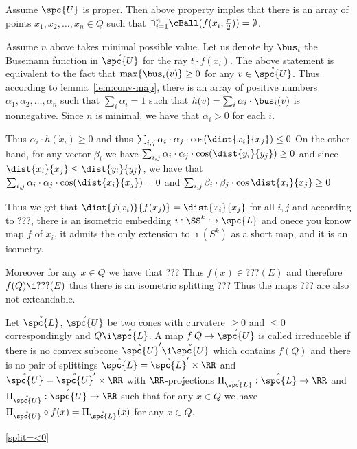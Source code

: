 {Assume $\spc{U}$ is proper.
Then above property imples that there is an array of points $x_1,x_2,\dots, x_n\in Q$ such that
$\cap_{i=1}^n\cBall(f(x_i,\tfrac\pi2))=\emptyset$.

Assume $n$ above takes minimal possible value.
Let us denote by $\bus_i$ the Busemann function in $\mathring{\spc{U}}$ for the ray $t\cdot f(x_i)$.
The above statement is equivalent to the fact that $\max\{\bus_i(v)\}\ge0$ for any $v\in \mathring{\spc{U}}$.
Thus according to lemma~\ref{lem:conv-map}, there is an array of positive numbers $\alpha_1,\alpha_2,\dots,\alpha_n$ 
such that $\sum_i\alpha_i=1$ such that $h(v)=\sum_i\alpha_i\cdot\bus_i(v)$ is nonnegative.
Since $n$ is minimal, we have that $\alpha_i>0$ for each $i$.

Thus $\alpha_i\cdot h(\mathring{x}_i)\ge 0$ and thus
$\sum_{i,j}\alpha_i\cdot\alpha_j\cdot\cos(\dist{x_i}{x_j})\le 0$
On the other hand, for any vector $\beta_i$ we have 
$\sum_{i,j}\alpha_i\cdot\alpha_j\cdot\cos(\dist{y_i}{y_j})\ge 0$ and since
$\dist{x_i}{x_j}\le\dist{y_i}{y_j}$, we have that $\sum_{i,j}\alpha_i\cdot\alpha_j\cdot\cos(\dist{x_i}{x_j})=0$ and $\sum_{i,j}\beta_i\cdot\beta_j\cdot\cos\dist{x_i}{x_j}\ge0$



Thus we get that $\dist{f(x_i)}{f(x_j)}=\dist{x_i}{x_j}$ for all $i,j$ and according to ???, there is an isometric embedding $\imath:\SS^k\hookrightarrow \spc{L}$ and onece you konow map $f$ of $x_i$, it admits the only extension to $\imath(S^k)$ as a short map, and it is an isometry.

Moreover for any $x\in Q$ we have that ???
Thus $f(x)\in ???(E)$ and therefore $f(Q)\i ???(E)$ thus there is an isometric splitting ???
Thus the maps ??? are also not exteandable.


Let $\mathring{\spc{L}}$, $\mathring{\spc{U}}$ be two cones with curvatere $\ge0$ and $\le0$ correspondingly 
and $Q\i \mathring{\spc{L}}$.
A map $f\:Q\to \mathring{\spc{U}}$ is called irreduceble if there is no convex subcone $\mathring{\spc{U}}'\i \mathring{\spc{U}}$ which contains $f(Q)$
and there is no pair of splittings $\mathring{\spc{L}}=\mathring{\spc{L}}'\times\RR$ and $\mathring{\spc{U}}=\mathring{\spc{U}}'\times\RR$ with $\RR$-projections 
$\Pi_{\mathring{\spc{L}}}:\mathring{\spc{L}}\to\RR$ and $\Pi_{\mathring{\spc{U}}}:\mathring{\spc{U}}\to\RR$ such that for any $x\in Q$ we have 
$\Pi_{\mathring{\spc{U}}}\circ f(x)=\Pi_{\mathring{\spc{L}}}(x)$ for any $x\in Q$.

\ref{split=<0}

}

